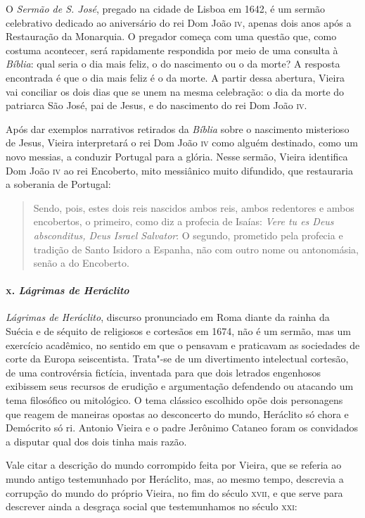 O \emph{Sermão de S. José}, pregado na cidade de Lisboa em 1642, é um
sermão celebrativo dedicado ao aniversário do rei Dom João \textsc{iv}, apenas
dois anos após a Restauração da Monarquia. O pregador começa com uma
questão que, como costuma acontecer, será rapidamente respondida por
meio de uma consulta à \emph{Bíblia}: qual seria o dia mais feliz, o do
nascimento ou o da morte? A resposta encontrada é que o dia mais feliz é
o da morte. A partir dessa abertura, Vieira vai conciliar os dois dias
que se unem na mesma celebração: o dia da morte do patriarca São José,
pai de Jesus, e do nascimento do rei Dom João \textsc{iv}.

Após dar exemplos narrativos retirados da \emph{Bíblia} sobre o
nascimento misterioso de Jesus, Vieira interpretará o rei Dom João \textsc{iv}
como alguém destinado, como um novo messias, a conduzir Portugal para a
glória. Nesse sermão, Vieira identifica Dom João \textsc{iv} ao rei Encoberto,
mito messiânico muito difundido, que restauraria a soberania de
Portugal:

\begin{quote}
Sendo, pois, estes dois reis nascidos ambos reis, ambos redentores e
ambos encobertos, o primeiro, como diz a profecia de Isaías: \emph{Vere
tu es Deus absconditus, Deus Israel Salvator}: O segundo, prometido pela
profecia e tradição de Santo Isidoro a Espanha, não com outro nome ou
antonomásia, senão a do Encoberto.
\end{quote}

\paragraph{\textsc{x}. \emph{Lágrimas de Heráclito}}

\emph{Lágrimas de Heráclito}, discurso pronunciado em Roma diante da
rainha da Suécia e de séquito de religiosos e cortesãos em 1674, não é
um sermão, mas um exercício acadêmico, no sentido em que o pensavam e
praticavam as sociedades de corte da Europa seiscentista. Trata"-se de um
divertimento intelectual cortesão, de uma controvérsia fictícia,
inventada para que dois letrados engenhosos exibissem seus recursos de
erudição e argumentação defendendo ou atacando um tema filosófico ou
mitológico. O tema clássico escolhido opõe dois personagens que reagem
de maneiras opostas ao desconcerto do mundo, Heráclito só chora e
Demócrito só ri. Antonio Vieira e o padre Jerônimo Cataneo foram os
convidados a disputar qual dos dois tinha mais razão.

Vale citar a descrição do mundo corrompido feita por Vieira, que se
referia ao mundo antigo testemunhado por Heráclito, mas, ao mesmo tempo,
descrevia a corrupção do mundo do próprio Vieira, no fim do século \textsc{xvii},
e que serve para descrever ainda a desgraça social que testemunhamos no
século \textsc{xxi}:

